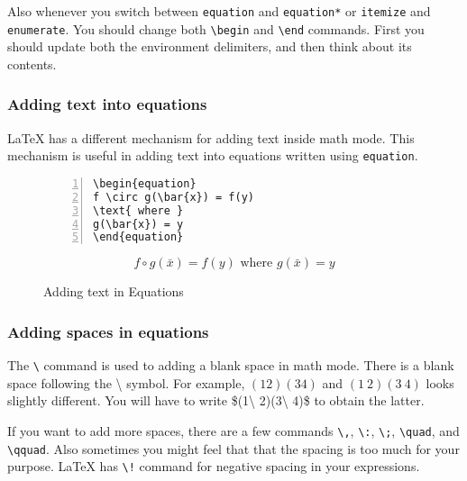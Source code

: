 \documentclass{article}
\begin{document}
	Also whenever you switch between \texttt{equation} and \texttt{equation*} or \texttt{itemize} and \texttt{enumerate}. You should change both \texttt{\textbackslash begin} and \texttt{\textbackslash end} commands. First you should update both the environment delimiters, and then think about its contents.

\subsubsection{Adding text into equations}
	\LaTeX{} has a different mechanism for adding text inside math mode. This mechanism is useful in adding text into equations written using \texttt{equation}.

\begin{figure}[h]
\centering
\begin{minipage}{0.45\textwidth}
\begin{Verbatim}[numbers = left]
\begin{equation}
f \circ g(\bar{x}) = f(y)
\text{ where }
g(\bar{x}) = y
\end{equation}
\end{Verbatim}
\end{minipage}
\begin{minipage}{0.45\textwidth}
\begin{equation}
f \circ g(\bar{x}) = f(y)
\text{ where }
g(\bar{x}) = y
\end{equation}
\end{minipage} 
\caption{Adding text in Equations}
\label{fig:textAndEquation}
\end{figure}

\subsubsection{Adding spaces in equations}
	The \texttt{\textbackslash } command is used to adding a blank space in math mode. There is a blank space following the \textbackslash{} symbol. For example, $(1 2)(3 4)$ and $(1\ 2)(3\ 4)$ looks slightly different. You will have to write \$(1\textbackslash{} 2)(3\textbackslash{} 4)\$ to obtain the latter.

	If you want to add more spaces, there are a few commands \texttt{\textbackslash,}, \texttt{\textbackslash:}, \texttt{\textbackslash;}, \texttt{\textbackslash quad}, and \texttt{\textbackslash qquad}. Also sometimes you might feel that that the spacing is too much for your purpose. \LaTeX{} has \texttt{\textbackslash!} command for negative spacing in your expressions.
\end{document}
